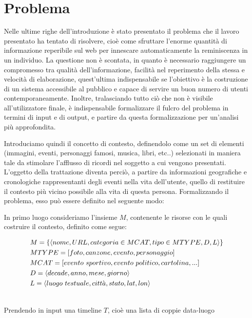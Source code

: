 \documentclass[sigproc-sp.tex]{subfiles}
\begin{document}
\section{Problema}
Nelle ultime righe dell’introduzione è stato presentato il problema che il lavoro presentato ha tentato di risolvere, cioè come sfruttare l’enorme quantità di informazione reperibile sul web per innescare automaticamente la reminiscenza in un individuo. La questione non è scontata, in quanto è necessario raggiungere un compromesso tra qualità dell’informazione, facilità nel reperimento della stessa e velocità di elaborazione, quest’ultima indispensabile se l’obiettivo è la costruzione di un sistema accessibile al pubblico e capace di servire un buon numero di utenti contemporaneamente. Inoltre, tralasciando tutto ciò che non è visibile all’utilizzatore finale, è indispensabile formalizzare il fulcro del problema in termini di input e di output, e partire da questa formalizzazione per un’analisi più approfondita.

Introduciamo quindi il concetto di contesto, definendolo come un set di elementi (immagini, eventi, personaggi famosi, musica, libri, etc..) selezionati in maniera tale da stimolare l’afflusso di ricordi nel soggetto a cui vengono presentati. L’oggetto della trattazione diventa perciò, a partire da informazioni geografiche e cronologiche rappresentanti degli eventi nella vita dell’utente, quello di restituire il contesto più vicino possibile alla vita di questa persona.
Formalizzando il problema, esso può essere definito nel seguente modo:
 
In primo luogo consideriamo l'insieme $M$, contenente le risorse con le quali costruire il contesto, definito come segue:

\begin{equation}
\begin{split}
&M = \{\langle nome, URL, categoria \in MCAT, tipo \in MTYPE , D, L\rangle\}\\
&MTYPE = [ foto,canzone,evento,personaggio ]\\
&MCAT = [evento \ sportivo,evento \ politico, cartolina, ...]\\
&D =  \langle decade, anno, mese, giorno\rangle\\
&L =  \langle luogo \ testuale, citt\grave{a}, stato, lat, lon\rangle\\
\notag
\end{split}
\end{equation}

Prendendo in input una timeline $T$, cioè una lista di coppie data-luogo
\end{document}
